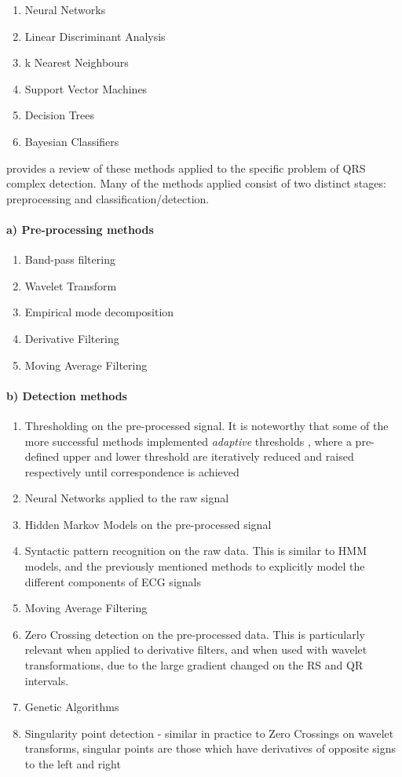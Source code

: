 \documentclass[9pt,conference]{IEEEtran}
\begin{document}
\begin{enumerate}
    \item Neural Networks
    \item Linear Discriminant Analysis
    \item k Nearest Neighbours
    \item Support Vector Machines
    \item Decision Trees
    \item Bayesian Classifiers
\end{enumerate}

\cite{ecgReview} provides a review of these methods applied to the specific problem of QRS complex detection. Many of the methods applied consist of two distinct stages: preprocessing and  classification/detection.

\paragraph*{a) \textbf{Pre-processing methods}}
\begin{enumerate}
    \item Band-pass filtering
    \item Wavelet Transform
    \item Empirical mode decomposition
    \item Derivative Filtering
    \item Moving Average Filtering
\end{enumerate}

\paragraph*{b) \textbf{Detection methods}}
\begin{enumerate}
    \item Thresholding on the pre-processed signal. It is noteworthy that some of the more successful methods implemented \textit{adaptive} thresholds \cite{adaptThresh}, where a pre-defined upper and lower threshold are iteratively reduced and raised respectively until correspondence is achieved
    \item Neural Networks applied to the raw signal
    \item Hidden Markov Models on the pre-processed signal
    \item Syntactic pattern recognition on the raw data. This is similar to HMM models, and the previously mentioned methods to explicitly model the different components of ECG signals
    \item Moving Average Filtering
    \item Zero Crossing detection on the pre-processed data. This is particularly relevant when applied to derivative filters, and when used with wavelet transformations, due to the large gradient changed on the RS and QR intervals.
    \item Genetic Algorithms
    \item Singularity point detection - similar in practice to Zero Crossings on wavelet transforms, singular points are those which have derivatives of opposite signs to the left and right \cite{singularECG}  
\end{enumerate}
\end{document}
